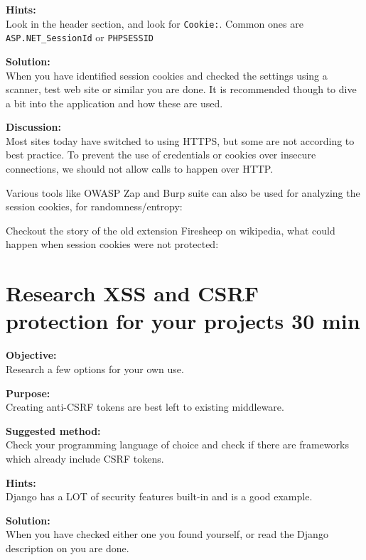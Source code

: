 \documentclass[a4paper,11pt,notitlepage]{report}
\begin{document}


{\bf Hints:}\\
Look in the header section, and look for \verb+Cookie:+. Common ones are \verb+ASP.NET_SessionId+ or \verb+PHPSESSID+

{\bf Solution:}\\
When you have identified session cookies and checked the settings using a scanner, test web site or similar you are done. It is recommended though to dive a bit into the application and how these are used.

{\bf Discussion:}\\
Most sites today have switched to using HTTPS, but some are not according to best practice. To prevent the use of credentials or cookies over insecure connections, we should not allow calls to happen over HTTP.

Various tools like OWASP Zap and Burp suite can also be used for analyzing the session cookies, for randomness/entropy:\\


Checkout the story of the old extension Firesheep on wikipedia, what could happen when session cookies were not protected:\\



\chapter{Research XSS and CSRF protection for your projects 30 min}
\label{ex:research-middleware-csrf}

{\bf Objective:}\\
Research a few options for your own use.


{\bf Purpose:}\\
Creating anti-CSRF tokens are best left to existing middleware.

{\bf Suggested method:}\\
Check your programming language of choice and check if there are frameworks which already include CSRF tokens.


{\bf Hints:}\\
Django has a LOT of security features built-in and is a good example.

{\bf Solution:}\\
When you have checked either one you found yourself, or read the Django description on  you are done.
\end{document}
